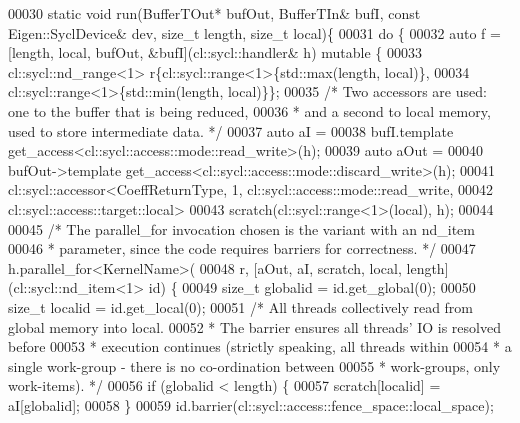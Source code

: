 \begin{DoxyCode}
00030 \textcolor{keyword}{static} \textcolor{keywordtype}{void} run(BufferTOut* bufOut, BufferTIn& bufI, \textcolor{keyword}{const} Eigen::SyclDevice& dev, \textcolor{keywordtype}{size\_t} length, \textcolor{keywordtype}{size\_t} 
      local)\{
00031   \textcolor{keywordflow}{do} \{
00032           \textcolor{keyword}{auto} f = [length, local, bufOut, &bufI](cl::sycl::handler& h) \textcolor{keyword}{mutable} \{
00033             cl::sycl::nd\_range<1> r\{cl::sycl::range<1>\{std::max(length, local)\},
00034                                     cl::sycl::range<1>\{std::min(length, local)\}\};
00035             \textcolor{comment}{/* Two accessors are used: one to the buffer that is being reduced,}
00036 \textcolor{comment}{             * and a second to local memory, used to store intermediate data. */}
00037             \textcolor{keyword}{auto} aI =
00038                 bufI.template get\_access<cl::sycl::access::mode::read\_write>(h);
00039             \textcolor{keyword}{auto} aOut =
00040                 bufOut->template get\_access<cl::sycl::access::mode::discard\_write>(h);
00041             cl::sycl::accessor<CoeffReturnType, 1, cl::sycl::access::mode::read\_write,
00042                                cl::sycl::access::target::local>
00043                 scratch(cl::sycl::range<1>(local), h);
00044 
00045             \textcolor{comment}{/* The parallel\_for invocation chosen is the variant with an nd\_item}
00046 \textcolor{comment}{             * parameter, since the code requires barriers for correctness. */}
00047             h.parallel\_for<KernelName>(
00048                 r, [aOut, aI, scratch, local, length](cl::sycl::nd\_item<1> id) \{
00049                   \textcolor{keywordtype}{size\_t} globalid = \textcolor{keywordtype}{id}.get\_global(0);
00050                   \textcolor{keywordtype}{size\_t} localid = \textcolor{keywordtype}{id}.get\_local(0);
00051                   \textcolor{comment}{/* All threads collectively read from global memory into local.}
00052 \textcolor{comment}{                   * The barrier ensures all threads' IO is resolved before}
00053 \textcolor{comment}{                   * execution continues (strictly speaking, all threads within}
00054 \textcolor{comment}{                   * a single work-group - there is no co-ordination between}
00055 \textcolor{comment}{                   * work-groups, only work-items). */}
00056                   \textcolor{keywordflow}{if} (globalid < length) \{
00057                     scratch[localid] = aI[globalid];
00058                   \}
00059                   \textcolor{keywordtype}{id}.barrier(cl::sycl::access::fence\_space::local\_space);

\end{DoxyCode}
